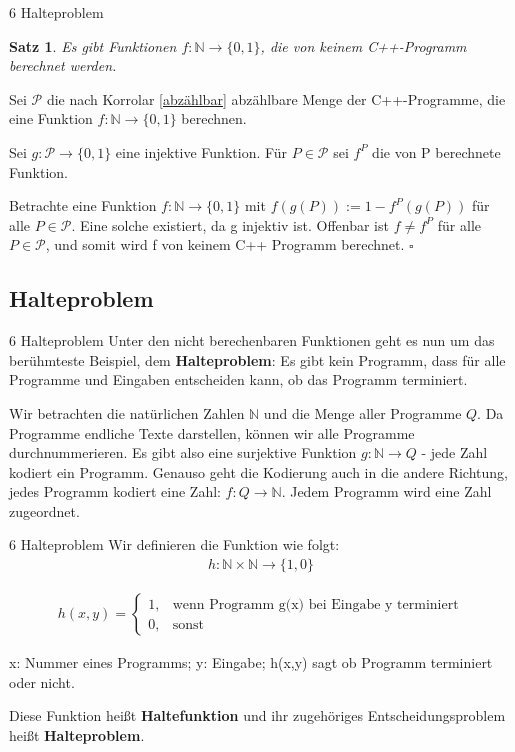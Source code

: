 \documentclass{beamer}
\newcommand{\N}{\mathbb{N}}%
\newcommand{\beweis}[1]{\textbf{\structure{Beweis~#1.}}}
\newtheorem{thm}{Satz}
\begin{document}
\begin{frame}{6 Halteproblem}
\begin{thm}
    Es gibt Funktionen \(f: \N\to \{0,1\} \), die von keinem C++-Programm berechnet werden.

\end{thm}

\beweis{5}
    Sei $\mathcal{P}$ die nach Korrolar \ref{abzählbar} abzählbare Menge der C++-Programme, die eine Funktion \(f: \N\to \{0,1\} \) berechnen.

    Sei \(g: \mathcal{P}\to \{0,1\} \) eine injektive Funktion. 
    Für \(P \in \mathcal{P}\) sei $f^P$ die von P berechnete Funktion.

    Betrachte eine Funktion \(f: \N\to \{0,1\} \) mit \( f(g(P)):=1-f^P(g(P))\) für alle \(P \in \mathcal{P}\).
    Eine solche existiert, da g injektiv ist. Offenbar ist \(
   f \neq f^P 
    \)
    für alle 
    \(
    P \in \mathcal{P}
    \), und somit wird f von keinem C++ Programm berechnet.
    \hfill$\square$
\end{frame}

\subsection{Halteproblem}
\begin{frame}{6 Halteproblem}
Unter den nicht berechenbaren Funktionen geht es nun um das berühmteste Beispiel, dem \textbf{Halteproblem}: Es gibt kein Programm, dass für alle Programme und Eingaben entscheiden kann, ob das Programm terminiert.

\medskip

Wir betrachten die natürlichen Zahlen $\N$ und die Menge aller Programme $Q$. Da Programme endliche Texte darstellen, können wir alle Programme durchnummerieren. Es gibt also eine surjektive Funktion \(g: \N \to Q \) - jede Zahl kodiert ein Programm.
Genauso geht die Kodierung auch in die andere Richtung, jedes Programm kodiert eine Zahl: \( f: Q \to \N
\). Jedem Programm wird eine Zahl zugeordnet.
\end{frame}

\begin{frame}{6 Halteproblem}
Wir definieren die Funktion wie folgt:
\begin{align}
    h: \N \times \N \to \{1,0\}
\end{align}

\begin{align}
    h(x,y) = \begin{cases}
        1,& \text{wenn Programm g(x) bei Eingabe y terminiert}\\
        0,& \text{sonst}
    \end{cases}
\end{align}

x: Nummer eines Programms; y: Eingabe; h(x,y) sagt ob Programm terminiert oder nicht.

\medskip

Diese Funktion heißt \textbf{Haltefunktion} und ihr zugehöriges Entscheidungsproblem heißt \textbf{Halteproblem}.
\end{frame}
\end{document}
